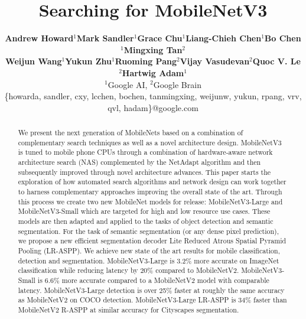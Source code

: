 \documentclass[10pt,twocolumn,letterpaper]{article}
\begin{document}
%
\title{Searching for MobileNetV3}
%

\author{
	\small
	\begin{tabular}{c c c c c c c}                              
	    \bf Andrew Howard$^1$ &
	    \bf Mark Sandler$^1$ &
	    \bf Grace Chu$^1$ &
	    \bf Liang-Chieh Chen$^1$ &
	    \bf Bo Chen$^1$ &
		\bf Mingxing Tan$^2$ \\
		\bf Weijun Wang$^1$ &
		\bf Yukun Zhu$^1$ &
		\bf Ruoming Pang$^2$ &
		\bf Vijay Vasudevan$^2$ &
		\bf Quoc V. Le$^2$ &
		\bf Hartwig Adam$^1$\\                                
		\multicolumn{7}{c}{$^1$Google AI, $^2$Google Brain} \\                                              
		\multicolumn{7}{c}{\{howarda, sandler, cxy, lcchen, bochen, tanmingxing, weijunw, yukun, rpang, vrv, qvl, hadam\}@google.com} \\
	\end{tabular}                                                                       
} 

\maketitle
%
\ificcvfinal\thispagestyle{empty}\fi
%
\begin{abstract}
%
 We present the next generation of MobileNets based on a combination of complementary search techniques as well as a novel architecture design. MobileNetV3 is tuned to mobile phone CPUs through a combination of hardware-aware network architecture search (NAS) complemented by the NetAdapt algorithm and then subsequently improved through novel architecture advances. This paper starts the exploration of how automated search algorithms and network design can work together to harness complementary approaches improving the overall state of the art.  Through this process we create two new MobileNet models for release: MobileNetV3-Large and MobileNetV3-Small which are targeted for  high and low resource use cases. These models are then adapted and applied to the tasks of object detection and semantic segmentation. For the task of semantic segmentation (or any dense pixel prediction), we propose a new efficient segmentation decoder Lite Reduced Atrous Spatial Pyramid Pooling (LR-ASPP). We achieve new state of the art results for mobile classification, detection and segmentation. MobileNetV3-Large is 3.2\% more accurate on ImageNet classification while reducing latency by 20\% compared to MobileNetV2. MobileNetV3-Small is 6.6\% more accurate compared to a MobileNetV2 model with comparable latency. MobileNetV3-Large detection is over 25\% faster at roughly the same accuracy as MobileNetV2 on COCO detection. MobileNetV3-Large LR-ASPP is 34\% faster than MobileNetV2 R-ASPP at similar accuracy for Cityscapes segmentation. 
%
%

\end{abstract}
\end{document}
